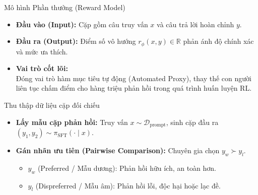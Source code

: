 \begin{frame}{Mô hình Phần thưởng (Reward Model)}
  \small
  \begin{itemize}\setlength{\itemsep}{6pt}
    \item \textbf{Đầu vào (Input):} Cặp gồm câu truy vấn $x$ và câu trả lời hoàn chỉnh $y$.
    \item \textbf{Đầu ra (Output):} Điểm số vô hướng $r_\phi(x, y) \in \mathbb{R}$ phản ánh độ chính xác và mức ưa thích.
    \item \textbf{Vai trò cốt lõi:}\\
      Đóng vai trò hàm mục tiêu tự động (Automated Proxy), thay thế con người liên tục chấm điểm cho hàng triệu phản hồi trong quá trình huấn luyện RL.
  \end{itemize}
  \par\vspace{0pt}
\end{frame}

\begin{frame}{Thu thập dữ liệu cặp đối chiếu}
  \small
  \begin{itemize}\setlength{\itemsep}{6pt}
    \item \textbf{Lấy mẫu cặp phản hồi:} Truy vấn $x \sim \mathcal{D}_{\text{prompt}}$, sinh cặp đầu ra $(y_1, y_2) \sim \pi_{\text{SFT}}(\cdot \mid x)$.
    \item \textbf{Gán nhãn ưu tiên (Pairwise Comparison):} Chuyên gia chọn $y_w \succ y_l$.
      \begin{itemize}\small\setlength{\itemsep}{2pt}
        \item $y_w$ (Preferred / Mẫu dương): Phản hồi hữu ích, an toàn hơn.
        \item $y_l$ (Dispreferred / Mẫu âm): Phản hồi lỗi, độc hại hoặc lạc đề.
      \end{itemize}
  \end{itemize}
  \par\vspace{0pt}
\end{frame}

